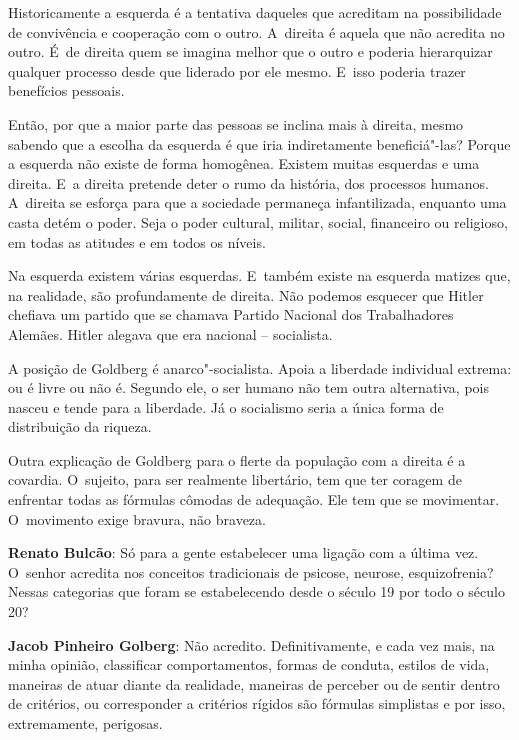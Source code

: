 Historicamente a esquerda é a tentativa daqueles que acreditam na
possibilidade de convivência e cooperação com o outro. A~direita é
aquela que não acredita no outro. É~de direita quem se imagina melhor
que o outro e poderia hierarquizar qualquer processo desde que liderado
por ele mesmo. E~isso poderia trazer benefícios pessoais.

Então, por que a maior parte das pessoas se inclina mais à direita, mesmo
sabendo que a escolha da esquerda é que iria indiretamente
beneficiá"-las? Porque a esquerda não existe de forma homogênea. Existem
muitas esquerdas e uma direita. E~a direita pretende deter o rumo da
história, dos processos humanos. A~direita se esforça para que a
sociedade permaneça infantilizada, enquanto uma casta detém o poder.
Seja o poder cultural, militar, social, financeiro ou religioso, em
todas as atitudes e em todos os níveis.

 
Na esquerda existem várias esquerdas. E~também existe na esquerda
matizes que, na realidade, são profundamente de direita. Não podemos
esquecer que Hitler chefiava um partido que se chamava Partido Nacional
dos Trabalhadores Alemães. Hitler alegava que era nacional --
socialista.

A posição de Goldberg é anarco"-socialista. Apoia a liberdade individual
extrema: ou é livre ou não é. Segundo ele, o ser humano não tem outra
alternativa, pois nasceu e tende para a liberdade. Já o socialismo seria
a única forma de distribuição da riqueza.

Outra explicação de Goldberg para o flerte da população com a direita é
a covardia. O~sujeito, para ser realmente libertário, tem que ter
coragem de enfrentar todas as fórmulas cômodas de adequação. Ele tem que
se movimentar. O~movimento exige bravura, não braveza.

\begin{center}\asterisc{}\end{center}


\abrefala 

\textbf{Renato Bulcão}: Só para a gente estabelecer uma ligação com a
última vez. O~senhor acredita nos conceitos tradicionais de psicose,
neurose, esquizofrenia? Nessas categorias que foram se estabelecendo
desde o século 19 por todo o século 20?

 

\textbf{Jacob Pinheiro Golberg}: Não acredito. Definitivamente, e cada
vez mais, na minha opinião, classificar comportamentos, formas de
conduta, estilos de vida, maneiras de atuar diante da realidade,
maneiras de perceber ou de sentir dentro de critérios, ou corresponder a
critérios rígidos são fórmulas simplistas e por isso, extremamente,
perigosas.

